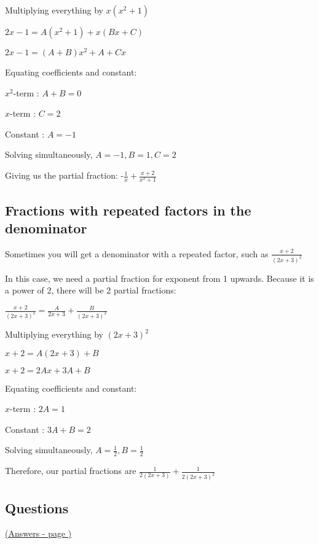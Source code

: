\documentclass[../main.tex]{subfiles}
\begin{document}
Multiplying everything by $x(x^2+1)$

$2x-1=A(x^2+1)+x(Bx+C)$

$2x-1=(A+B)x^2+A+Cx$

Equating coefficients and constant:

$x^2$-term : $A+B=0$

$x$-term : $C=2$

Constant : $A=-1$

Solving simultaneously, $A=-1, B=1, C=2$

Giving us the partial fraction: -$\frac{1}{x}+\frac{x+2}{x^2+1}$

\subsection*{Fractions with repeated factors in the denominator}
Sometimes you will get a denominator with a repeated factor, such as $\frac{x+2}{(2x+3)^2}$

In this case, we need a partial fraction for exponent from 1 upwards. Because it is a power of 2, there will be 2 partial fractions:

$\frac{x+2}{(2x+3)^2}=\frac{A}{2x+3}+\frac{B}{(2x+3)^2}$

Multiplying everything by $(2x+3)^2$

$x+2=A(2x+3)+B$

$x+2=2Ax+3A+B$

Equating coefficients and constant:

$x$-term : $2A=1$

Constant : $3A+B=2$

Solving simultaneously, $A=\frac{1}{2}, B=\frac{1}{2}$

Therefore, our partial fractions are $\frac{1}{2(2x+3)}+\frac{1}{2(2x+3)^2}$



\pagebreak
\hypertarget{partialfractionslink}{\subsection*{Questions}}
\hyperlink{partialfractionsanswers}{(Answers - page \pageref*{Partial fractions answers})}
\label{partial fractions}
\end{document}
